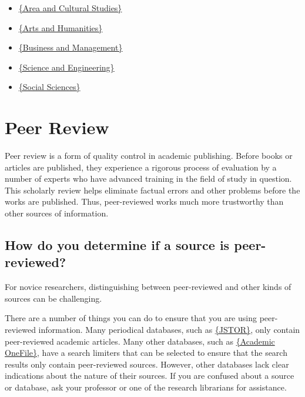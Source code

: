 {\begin{itemize}
\item\href{http://www.bu.edu/library/research/guides/research-guides/area-and-cu
ltural-studies/}{\{Area and Cultural Studies\}}
    
\item\href{http://www.bu.edu/library/research/guides/research-guides/arts-and-hu
manities/}{\{Arts and Humanities\}}

\item\href{http://www.bu.edu/library/research/guides/research-guides/management-
business/}{\{Business and Management\}}

\item\href{http://www.bu.edu/library/research/guides/research-guides/science-and
-engineering/}{\{Science and Engineering\}}

\item\href{http://www.bu.edu/library/research/guides/research-guides/social-scie
nce/}{\{Social Sciences\}}
\end{itemize}

\section{Peer Review}

Peer review is a form of quality control in academic publishing. Before books 
or articles are published, they experience a rigorous process of evaluation by 
a number of experts who have advanced training in the field of study in 
question. This scholarly review helps eliminate factual errors and other 
problems before the works are published. Thus, peer-reviewed works much more 
trustworthy than other sources of information. 

\subsection{How do you determine if a source is peer-reviewed?}

For novice researchers, distinguishing between peer-reviewed and other kinds of 
sources can be challenging. 

There are a number of things you can do to ensure that you are using 
peer-reviewed information. Many periodical databases, such as 
\href{http://www.jstor.org.ezproxy.bu.edu/jstor/}{\{JSTOR\}}, only contain 
peer-reviewed academic articles. Many other databases, such as 
\href{http://infotrac.galegroup.com.ezproxy.bu.edu/itweb/mlin_b_bumml?db=AONE}{\{Academic OneFile\}}, have a search limiters that can be selected to ensure 
that the search results only contain peer-reviewed sources. However, other 
databases lack clear indications about the nature of their sources. If you are 
confused about a source or database, ask your professor or one of the research 
librarians for assistance.

}
